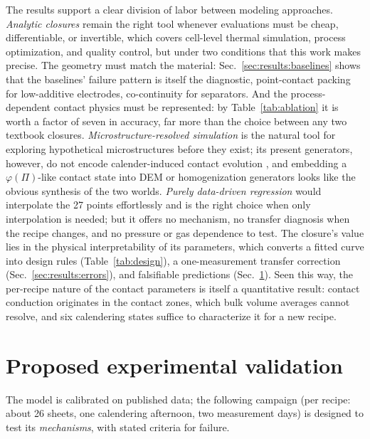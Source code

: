 \documentclass[10pt,a4paper]{article}
\begin{document}
The results support a clear division of labor between modeling approaches. \emph{Analytic closures} remain the right tool whenever evaluations must be cheap, differentiable, or invertible, which covers cell-level thermal simulation, process optimization, and quality control, but under two conditions that this work makes precise. The geometry must match the material: Sec.~\ref{sec:results:baselines} shows that the baselines' failure pattern is itself the diagnostic, point-contact packing for low-additive electrodes, co-continuity for separators. And the process-dependent contact physics must be represented: by Table~\ref{tab:ablation} it is worth a factor of seven in accuracy, far more than the choice between any two textbook closures. \emph{Microstructure-resolved simulation} is the natural tool for exploring hypothetical microstructures before they exist; its present generators, however, do not encode calender-induced contact evolution \cite{gandert2023}, and embedding a $\varphi(\Pi)$-like contact state into DEM or homogenization generators looks like the obvious synthesis of the two worlds. \emph{Purely data-driven regression} would interpolate the 27 points effortlessly and is the right choice when only interpolation is needed; but it offers no mechanism, no transfer diagnosis when the recipe changes, and no pressure or gas dependence to test. The closure's value lies in the physical interpretability of its parameters, which converts a fitted curve into design rules (Table~\ref{tab:design}), a one-measurement transfer correction (Sec.~\ref{sec:results:errors}), and falsifiable predictions (Sec.~\ref{sec:experiments}). Seen this way, the per-recipe nature of the contact parameters is itself a quantitative result: contact conduction originates in the contact zones, which bulk volume averages cannot resolve, and six calendering states suffice to characterize it for a new recipe.

\section{Proposed experimental validation}
\label{sec:experiments}

The model is calibrated on published data; the following campaign (per recipe: about 26 sheets, one calendering afternoon, two measurement days) is designed to test its \emph{mechanisms}, with stated criteria for failure.
\end{document}
